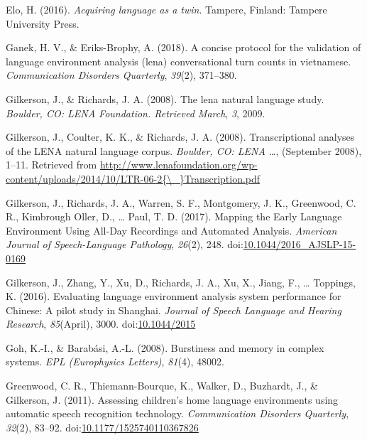 \documentclass[english,floatsintext,man]{apa6}
\begin{document}
\hypertarget{ref-Elo}{}
Elo, H. (2016). \emph{Acquiring language as a twin}. Tampere, Finland:
Tampere University Press.

\hypertarget{ref-ganek2018concise}{}
Ganek, H. V., \& Eriks-Brophy, A. (2018). A concise protocol for the
validation of language environment analysis (lena) conversational turn
counts in vietnamese. \emph{Communication Disorders Quarterly},
\emph{39}(2), 371--380.

\hypertarget{ref-gilkerson2008lena}{}
Gilkerson, J., \& Richards, J. A. (2008). The lena natural language
study. \emph{Boulder, CO: LENA Foundation. Retrieved March}, \emph{3},
2009.

\hypertarget{ref-Gilkerson2008ltr6}{}
Gilkerson, J., Coulter, K. K., \& Richards, J. A. (2008).
Transcriptional analyses of the LENA natural language corpus.
\emph{Boulder, CO: LENA \ldots{}}, (September 2008), 1--11. Retrieved
from
\href{http://www.lenafoundation.org/wp-content/uploads/2014/10/LTR-06-2\%7B/_\%7DTranscription.pdf}{http://www.lenafoundation.org/wp-content/uploads/2014/10/LTR-06-2\{\textbackslash{}\_\}Transcription.pdf}

\hypertarget{ref-Gilkerson2017}{}
Gilkerson, J., Richards, J. A., Warren, S. F., Montgomery, J. K.,
Greenwood, C. R., Kimbrough Oller, D., \ldots{} Paul, T. D. (2017).
Mapping the Early Language Environment Using All-Day Recordings and
Automated Analysis. \emph{American Journal of Speech-Language
Pathology}, \emph{26}(2), 248.
doi:\href{https://doi.org/10.1044/2016_AJSLP-15-0169}{10.1044/2016\_AJSLP-15-0169}

\hypertarget{ref-Gilkerson2016}{}
Gilkerson, J., Zhang, Y., Xu, D., Richards, J. A., Xu, X., Jiang, F.,
\ldots{} Toppings, K. (2016). Evaluating language environment analysis
system performance for Chinese: A pilot study in Shanghai. \emph{Journal
of Speech Language and Hearing Research}, \emph{85}(April), 3000.
doi:\href{https://doi.org/10.1044/2015}{10.1044/2015}

\hypertarget{ref-goh2008burstiness}{}
Goh, K.-I., \& Barabási, A.-L. (2008). Burstiness and memory in complex
systems. \emph{EPL (Europhysics Letters)}, \emph{81}(4), 48002.

\hypertarget{ref-Greenwood2011}{}
Greenwood, C. R., Thiemann-Bourque, K., Walker, D., Buzhardt, J., \&
Gilkerson, J. (2011). Assessing children's home language environments
using automatic speech recognition technology. \emph{Communication
Disorders Quarterly}, \emph{32}(2), 83--92.
doi:\href{https://doi.org/10.1177/1525740110367826}{10.1177/1525740110367826}
\end{document}
